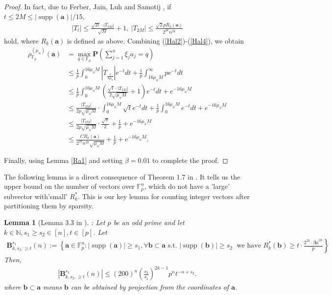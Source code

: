 \documentclass{article}
\numberwithin{equation}{section}
\theoremstyle{plain}
\newtheorem{lemma}{Lemma}[section]
\begin{document}
\begin{proof}
In fact, due to Ferber, Jain, Luh and Samotij \cite{MR4273471},
if $t \leqslant 2 M \leqslant|\operatorname{supp}(\boldsymbol{a})| / 15$, 
\begin{align}\label{Hal4}
\left|T_t\right| \leqslant \frac{\sqrt{2 t} \cdot\left|T_{2 M}\right|}{\sqrt{M}}+1, ~\left|T_{2M}\right| \leqslant \frac{\sqrt{2} p R_k(\boldsymbol{a})}{2^{2 k} n^{2 k}}
\end{align}
hold, 
where $R_k(\boldsymbol{a})$ is defined as above. Combining (\ref{Hal2})-(\ref{Hal4}), we obtain
\begin{align*}
\rho^{(\mu_{n})}_{\mathbb{F}_p}(\boldsymbol{a}) &=
\max _{q \in \mathbb{F}_p} \textbf{P}\left(\sum_{j=1}^n \xi_j a_j=q\right)\\ & \leqslant \frac{1}{p} \int_0^{16\mu_{n} M}\left|T_{\frac{t}{8\mu_{n}}}\right| e^{-t} d t+\frac{1}{p} \int_{16\mu_{n} M}^{\infty} p e^{-t} d t \\
& \leqslant \frac{1}{p} \int_0^{16\mu_{n} M}\left(\frac{\sqrt{ t} \cdot\left|T_{2 M}\right|}{2\sqrt{\mu_{n} M}}+1\right) e^{-t} d t+e^{-16\mu_{n} M} \\
& \leqslant \frac{\left|T_{2 M}\right|}{2p \sqrt{\mu_{n} M}} \cdot \int_0^{16\mu_{n} M} \sqrt{t} e^{-t} d t+\frac{1}{p} \int_0^{16\mu_{n} M} e^{-t} d t+e^{-16\mu_{n} M} \\
& \leqslant \frac{\left|T_{2 M}\right|}{2p \sqrt{\mu_{n} M}} \cdot \frac{\sqrt{\pi}}{2}+\frac{1}{p}+e^{-16\mu_{n} M} \\
& \leqslant \frac{C R_k(\boldsymbol{a})}{2^{2 k} n^{2 k} \sqrt{\mu_{n} M}}+\frac{1}{p}+e^{-16\mu_{n} M}.
\end{align*}
\par
Finally, using Lemma \ref{Ra1} and setting $\beta = 0.01$ to complete the proof.
\end{proof}
\par
The following lemma is a direct consequence of Theorem 1.7 in \cite{MR4282089}. It tells us the upper bound on the number of vectors over $\mathbb{F}_p^n$, which do not have a 'large' subvector with'small' $R_k^*$. This is our key lemma for counting integer vectors after partitioning them by sparsity.
\begin{lemma}[Lemma 3.3 in \cite{MR4282089}]\label{num}: Let $p$ be an odd prime and let $k \in \mathbb{N}, s_1 \geq s_2 \in[n], t \in[p]$. Let
\begin{align*}
\boldsymbol{B}_{k, s_2, \geq t}^{s_1}(n):=\left\{\boldsymbol{a} \in \mathbb{F}_p^n:|\operatorname{supp}(\boldsymbol{a})| \geq s_1, \forall \boldsymbol{b} \subset \boldsymbol{a} \text { s.t. }|\operatorname{supp}(\boldsymbol{b})| \geq s_2\right.\; 
\text { we have } \left.R_k^*(\boldsymbol{b}) \geq t \cdot \frac{2^{2 k} \cdot|\boldsymbol{b}|^{2 k}}{p}\right\}
\end{align*}
Then,
\begin{align*}
\left|\boldsymbol{B}_{k, s_2, \geq t}^{s_1}(n)\right| \leq(200)^n\left(\frac{s_2}{s_1}\right)^{2 k-1} p^n t^{-n+s_2}.
\end{align*}
where $\boldsymbol{b} \subset \boldsymbol{a}$ means $\boldsymbol{b}$ can be obtained by projection from the coordinates of $\boldsymbol{a}$.
\end{lemma}
\end{document}
